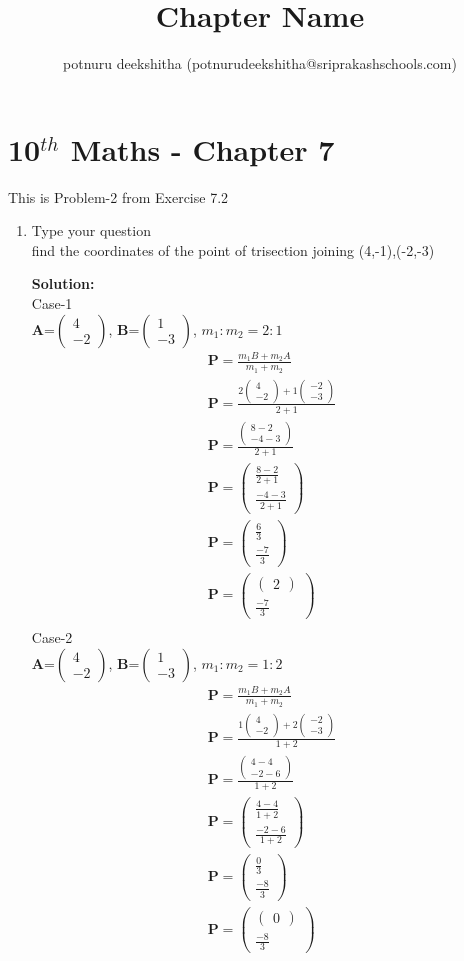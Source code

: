 \documentclass[12pt]{article}
\title{Chapter Name}
\author{potnuru deekshitha (potnurudeekshitha@sriprakashschools.com)}
\newcommand{\myvec}[1]{\ensuremath{\begin{pmatrix}#1\end{pmatrix}}}
\newcommand{\solution}{\noindent \textbf{Solution: }}
\let\vec\mathbf
\begin{document}
\maketitle
\section*{10$^{th}$ Maths - Chapter 7}
This is Problem-2 from Exercise 7.2
\begin{enumerate}
\item Type your question \\ find the coordinates of the point of trisection joining (4,-1),(-2,-3)

\solution\\
Case-1\\
$\vec{A}$=\myvec{4\\-2}, $\vec{B}$=\myvec{1\\-3},
$m_1:m_2=2:1$
\begin{align}
\vec{P}=\frac{m_1B+m_2A}{m_1+m_2}\\
\vec{P}=\frac{2\myvec{4\\-2}+1\myvec{-2\\-3}}{2+1}\\
\vec{P}=\frac{\myvec{8-2\\-4-3}}{2+1}\\
\vec{P}=\myvec{\frac{8-2}{2+1}\\\frac{-4-3}{2+1}}\\
\vec{P}=\myvec{\frac{6}{3}\\\frac{-7}{3}}\\
\vec{P}=\myvec{\myvec{2}\\\frac{-7}{3}}\\
\end{align}
Case-2\\
$\vec{A}$=\myvec{4\\-2}, $\vec{B}$=\myvec{1\\-3},
$m_1:m_2=1:2$
\begin{align}
\vec{P}=\frac{m_1B+m_2A}{m_1+m_2}\\
\vec{P}=\frac{1\myvec{4\\-2}+2\myvec{-2\\-3}}{1+2}\\
\vec{P}=\frac{\myvec{4-4\\-2-6}}{1+2}\\
\vec{P}=\myvec{\frac{4-4}{1+2}\\\frac{-2-6}{1+2}}\\
\vec{P}=\myvec{\frac{0}{3}\\\frac{-8}{3}}\\
\vec{P}=\myvec{\myvec{0}\\\frac{-8}{3}}\\
\end{align}



\end{enumerate}
\end{document}
